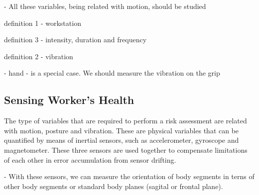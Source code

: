 - All these variables, being related with motion, should be studied  

definition 1 - workstation

definition 3 - intensity, duration and frequency

definition 2 - vibration

- hand - is a special case. We should measure the vibration on the grip 


\subsection{Sensing Worker's Health}
\label{subsec:sensing_worker}

The type of variables that are required to perform a risk assessment are related with motion, posture and vibration. These are physical variables that can be quantified by means of inertial sensors, such as accelerometer, gyroscope and magnetometer. These three sensors are used together to compensate limitations of each other in error accumulation from sensor drifting.

- With these sensors, we can measure the orientation of body segments in terns of other body segments or standard body planes (sagital or frontal plane). 